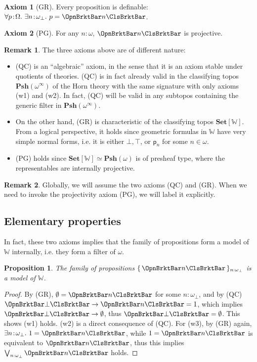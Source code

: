 \documentclass[a4paper,10pt]{amsart}
\newtheorem{proposition}{Proposition}[section]
\theoremstyle{definition}
\newtheorem{remark}{Remark}[section]
\newtheorem*{axiom}{Axiom}
\newcommand{\mb}[1]{\mathbf{#1}}
\newcommand{\mbb}[1]{\mathbb{#1}}
\newcommand{\ms}[1]{\mathsf{#1}}
\newcommand{\Set}{\mb{Set}}
\newcommand{\psh}{\mb{Psh}}
\newcommand{\set}[1]{\{\,#1\,\}}
\newcommand{\fa}[2]{\forall #1 \!:\! #2.\ }
\newcommand{\ex}[2]{\exists #1 \!:\! #2.\ }
\newcommand{\emp}{\emptyset}
\newcommand{\ass}[1]{\OpnBrktBar#1\ClsBrktBar}
\newcommand{\W}{\mathbb W}
\newcommand{\ovob}{\omega_\bot}
\newcommand{\Prop}{\Omega}
\begin{document}
\begin{axiom}[GR]\label{sgdqcc}
  Every proposition is definable: $\fa p\Prop \ex n{\ovob} p = \ass{n}$.
\end{axiom}

\begin{axiom}[PG]\label{projective}
  For any $n:\omega$, $\ass n$ is projective.
\end{axiom}

\begin{remark}
  The three axioms above are of different nature: 
  \begin{itemize}
    \item (QC) is an ``algebraic'' axiom, in the sense that it is an axiom stable under quotients of theories. (QC) is in fact already valid in the classifying topos $\psh(\omega^\infty)$ of the Horn theory with the same signature with only axioms (w1) and (w2). In fact, (QC) will be valid in any subtopos containing the generic filter in $\psh(\omega^\infty)$.
    \item On the other hand, (GR) is characteristic of the classifying topos $\Set[\mbb W]$. From a logical perspective, it holds since geometric formulas in $\mbb W$ have very simple normal forms, i.e. it is either $\bot,\top$, or $\ms p_n$ for some $n\in\omega$. 
    \item (PG) holds since $\Set[\mbb W] \simeq \psh(\omega)$ is of presheaf type, where the representables are internally projective.
  \end{itemize}
\end{remark}

\begin{remark}
  Globally, we will assume the two axioms (QC) and (GR). When we need to invoke the projectivity axiom (PG), we will label it explicitly.
\end{remark}

\subsection{Elementary properties}

In fact, these two axioms implies that the family of propositions form a model of $\W$ internally, i.e. they form a filter of $\omega$.

\begin{proposition}\label{ismodel}
  The family of propositions $\set{\ass n}_{n:\ovob}$ is a model of $\W$.
\end{proposition}
\begin{proof}
  By (GR), $\emp = \ass n$ for some $n \colon \ovob$, and by (QC) $\ass\bot \to \ass n = 1$, which implies $\ass\bot \to \emp$, thus $\ass\bot = \emp$. This shows (w1) holds. (w2) is a direct consequence of (QC). For (w3), by (GR) again, $\ex n{\ovob} 1 = \ass n$, while $1 = \ass n$ is equivalent to $\ass n$, thus this implies $\bigvee_{n:\ovob}\ass n$ holds.
\end{proof}
\end{document}
